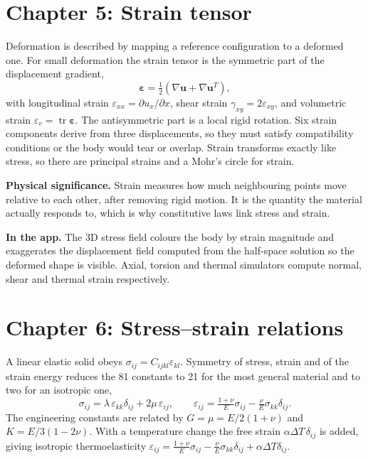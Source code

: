 \documentclass[11pt,a4paper]{article}
\newcommand{\tens}[1]{\bm{#1}}
\newcommand{\app}[1]{\par\smallskip\noindent\textbf{In the app.} #1}
\newcommand{\sig}[1]{\par\smallskip\noindent\textbf{Physical significance.} #1}
\begin{document}
\section{Chapter 5: Strain tensor}
Deformation is described by mapping a reference configuration to a deformed one. For small deformation the strain tensor is the symmetric part of the displacement gradient,
\begin{equation}
\tens{\varepsilon}=\tfrac12\left(\nabla\tens{u}+\nabla\tens{u}^T\right),
\end{equation}
with longitudinal strain $\varepsilon_{xx}=\partial u_x/\partial x$, shear strain $\gamma_{xy}=2\varepsilon_{xy}$, and volumetric strain $\varepsilon_v=\operatorname{tr}\tens{\varepsilon}$. The antisymmetric part is a local rigid rotation. Six strain components derive from three displacements, so they must satisfy compatibility conditions or the body would tear or overlap. Strain transforms exactly like stress, so there are principal strains and a Mohr's circle for strain.

\sig{Strain measures how much neighbouring points move relative to each other, after removing rigid motion. It is the quantity the material actually responds to, which is why constitutive laws link stress and strain.}
\app{The 3D stress field colours the body by strain magnitude and exaggerates the displacement field computed from the half-space solution so the deformed shape is visible. Axial, torsion and thermal simulators compute normal, shear and thermal strain respectively.}

\section{Chapter 6: Stress--strain relations}
A linear elastic solid obeys $\sigma_{ij}=C_{ijkl}\varepsilon_{kl}$. Symmetry of stress, strain and of the strain energy reduces the 81 constants to 21 for the most general material and to two for an isotropic one,
\begin{equation}
\sigma_{ij}=\lambda\,\varepsilon_{kk}\delta_{ij}+2\mu\,\varepsilon_{ij},\qquad
\varepsilon_{ij}=\tfrac{1+\nu}{E}\sigma_{ij}-\tfrac{\nu}{E}\sigma_{kk}\delta_{ij}.
\end{equation}
The engineering constants are related by $G=\mu=E/2(1+\nu)$ and $K=E/3(1-2\nu)$. With a temperature change the free strain $\alpha\Delta T\,\delta_{ij}$ is added, giving isotropic thermoelasticity $\varepsilon_{ij}=\frac{1+\nu}{E}\sigma_{ij}-\frac{\nu}{E}\sigma_{kk}\delta_{ij}+\alpha\Delta T\delta_{ij}$.
\end{document}

